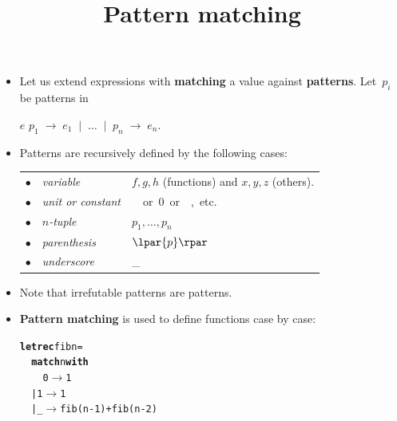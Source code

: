 \documentclass[wide]{slides}
\begin{document}
\begin{slide}
  \title{Pattern matching}

  \begin{itemize}

    \item Let us extend expressions with \textbf{matching} a value
      against \textbf{patterns}. Let~$p_i$ be patterns in
      \begin{center}
        \Xmatch{} $e$ \Xwith{} $p_1 \; \rightarrow \; e_1 \; \mid \;
        \ldots \; \mid \; p_n \; \rightarrow \; e_n$.
      \end{center}

    \item Patterns are recursively defined by the following cases:\\
      \smallskip
      \begin{tabular}{r@{\,\,}ll}
        $\bullet$
        & \emph{variable}
        & $f, g, h$ (functions) and $x, y, z$ (others). \\
        $\bullet$
        & \emph{unit or constant}
        & \unit \ or \textsf{0} or \Xtrue{}, etc.\\
        $\bullet$
        & \emph{$n$-tuple}
        & $p_1, \ldots, p_n$\\
        $\bullet$
        & \emph{parenthesis}
        & $\lpar{p}\rpar$\\
        $\bullet$
        & \emph{underscore}
        & {\Large \_}
      \end{tabular}

    \item Note that irrefutable patterns are patterns.

    \item \textbf{Pattern matching} is used to define functions case
      by case:
\begin{alltt}
\textbf{let rec} fib n =
\ \ \textbf{match} n \textbf{with}
\ \ \ \ 0 \(\rightarrow\) 1
\ \ | 1 \(\rightarrow\) 1
\ \ | \_ \(\rightarrow\) fib(n-1) + fib(n-2)
\end{alltt}

  \end{itemize}

\end{slide}
\end{document}
